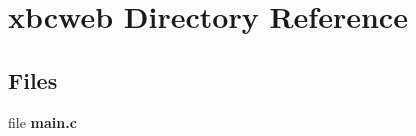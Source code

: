 \section{xbcweb Directory Reference}
\label{dir_5e71884f1d779429708b3bef428f89a9}
\subsection*{Files}
\begin{DoxyCompactItemize}
\item 
file {\bfseries main.\-c}
\end{DoxyCompactItemize}
